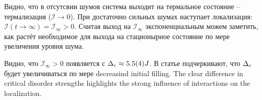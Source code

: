 Видно, что в отсутсвии шумов система выходит на термальное состояние -- термализация ($\mathcal{I} \to 0$). При достаточно сильных шумах наступает локализация: $\mathcal{I}(t \to \infty) = \mathcal{I}_\infty > 0$. Считая выход на $\mathcal{I}_\infty$ экспоненциальным можем заметить, как растёт необходимое для выхода на стационырное состояние по мере увеличения уровня шума. 

Видно, что $\mathcal{I}_\infty > 0$ появляется с $\Delta_{\textnormal{c}} \approx 5.5(4) J$. В статье подчеркивают, что $\Delta_{\textnormal{c}}$ будет увеличиваться по мере decreasind initial filling. The clear difference in critical disorder strengths highlights the strong influence of interactions on the localization.
